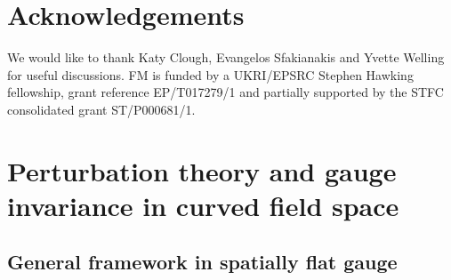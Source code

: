 \documentclass[a4paper,11pt]{article}
\begin{document}
\section*{Acknowledgements}

We would like to thank Katy Clough, Evangelos Sfakianakis and Yvette Welling for useful discussions. FM is funded by a UKRI/EPSRC Stephen Hawking fellowship, grant reference EP/T017279/1 and partially supported by the STFC consolidated grant ST/P000681/1.


\appendix

\section{Perturbation theory and gauge invariance in curved field space}
\label{AppA}

\subsection{General framework in spatially flat gauge}
\end{document}
